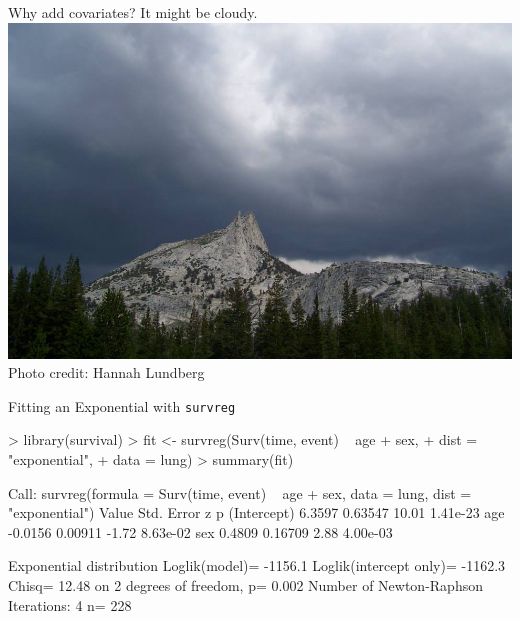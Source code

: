 \documentclass{beamer}
\newcommand\red[1]{{\color{red}#1}}
\newcommand\blue[1]{{\color{blue}#1}}
\newcommand\bblue[1]{{\color{blue}\textbf{#1}}}
\newcommand\green[1]{{\color{olive}#1}}
\begin{document}
\begin{frame}{Why add covariates? \pause It might be cloudy.}
\includegraphics[width = .9\textwidth]{figs/tuolumne_clouds} \\
\footnotesize Photo credit: Hannah Lundberg
\end{frame}


\begin{frame}[fragile]{Fitting an Exponential with \texttt{survreg}}
\begin{footnotesize}
\begin{semiverbatim}
> library(survival)
> fit <- survreg(Surv(time, event) ~ age + sex,
+                dist = "exponential",
+                data = lung)
> summary(fit)

Call:
survreg(formula = Surv(time, event) ~ age + sex, data = lung, 
    dist = "exponential")
              Value Std. Error     z        p
(Intercept)  6.3597    0.63547 10.01 1.41e-23
age         -0.0156    0.00911 -1.72 8.63e-02
sex          0.4809    0.16709  2.88 4.00e-03

Exponential distribution
Loglik(model)= -1156.1   Loglik(intercept only)= -1162.3
	Chisq= 12.48 on 2 degrees of freedom, p= 0.002 
Number of Newton-Raphson Iterations: 4 
n= 228 
\end{semiverbatim}
\end{footnotesize}
\end{frame}
\end{document}
